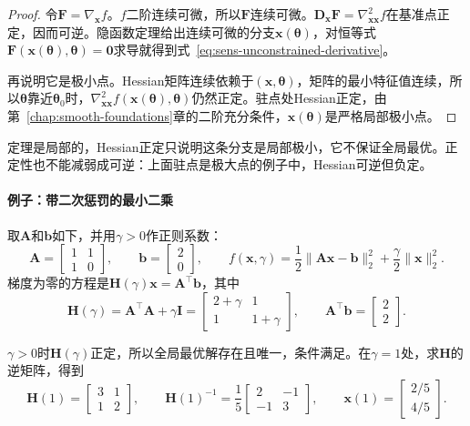 \begin{proof}
令$\bm{F}=\nabla_{\bm{x}}f$。$f$二阶连续可微，所以$\bm{F}$连续可微。$\bm{D}_{\bm{x}}\bm{F}=\nabla^2_{\bm{x}\bm{x}}f$在基准点正定，因而可逆。隐函数定理给出连续可微的分支$\bm{x}(\bm{\theta})$，对恒等式$\bm{F}(\bm{x}(\bm{\theta}),\bm{\theta})=\bm{0}$求导就得到式~\eqref{eq:sens-unconstrained-derivative}。

再说明它是极小点。Hessian矩阵连续依赖于$(\bm{x},\bm{\theta})$，矩阵的最小特征值连续，所以$\bm{\theta}$靠近$\bm{\theta}_0$时，$\nabla^2_{\bm{x}\bm{x}}f(\bm{x}(\bm{\theta}),\bm{\theta})$仍然正定。驻点处Hessian正定，由第~\ref{chap:smooth-foundations}章的二阶充分条件，$\bm{x}(\bm{\theta})$是严格局部极小点。
\end{proof}

定理是局部的，Hessian正定只说明这条分支是局部极小，它不保证全局最优。正定性也不能减弱成可逆：上面驻点是极大点的例子中，Hessian可逆但负定。

\paragraph{例子：带二次惩罚的最小二乘}
取$\bm{A}$和$\bm{b}$如下，并用$\gamma>0$作正则系数：
\[
 \bm{A}=\begin{bmatrix}1&1\\1&0\end{bmatrix},\qquad
 \bm{b}=\begin{bmatrix}2\\0\end{bmatrix},\qquad
 f(\bm{x},\gamma)=\frac12\lVert\bm{A}\bm{x}-\bm{b}\rVert_2^2+\frac{\gamma}{2}\lVert\bm{x}\rVert_2^2.
\]
梯度为零的方程是$\bm{H}(\gamma)\bm{x}=\bm{A}^{\top}\bm{b}$，其中
\[
 \bm{H}(\gamma)=\bm{A}^{\top}\bm{A}+\gamma\bm{I}=\begin{bmatrix}2+\gamma&1\\1&1+\gamma\end{bmatrix},\qquad
 \bm{A}^{\top}\bm{b}=\begin{bmatrix}2\\2\end{bmatrix}.
\]

$\gamma>0$时$\bm{H}(\gamma)$正定，所以全局最优解存在且唯一，条件满足。在$\gamma=1$处，求$\bm{H}$的逆矩阵，得到
\[
 \bm{H}(1)=\begin{bmatrix}3&1\\1&2\end{bmatrix},\qquad
 \bm{H}(1)^{-1}=\frac15\begin{bmatrix}2&-1\\-1&3\end{bmatrix},\qquad
 \bm{x}(1)=\begin{bmatrix}2/5\\4/5\end{bmatrix}.
\]

